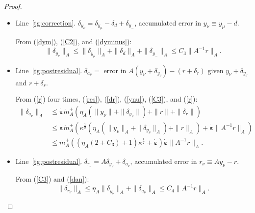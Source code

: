 \documentclass[onefignum,onetabnum]{siamart220329}
\newcommand{\ewed}{\boldsymbol{\dot{\varepsilon}}}
\newcommand{\aladot}{{\dot{m}}_A^+}
\begin{document}
{\begin{proof}
\begin{itemize}
From (\ref{pm}), (\ref{e2E}) twice, (\ref{ynu}), (\ref{C2}), and (\ref{dym}):
\begin{align}
\label{dyminus}
\|\delta_{y_-}\| &\le \ewed \|(y_\mu + \delta_{y_\mu}) - (d + \delta_{d})\| \\
&\le \ewed (\|y_\mu - d\| + \|\delta_{y_\mu}\| + \|\delta_{d}\|) \nonumber \\
&\le \ewed \kappa^\frac{1}{2} (\|y_\nu\|_A + \|\delta_{d}\|_A) + \ewed \|\delta_{y_\mu}\| \nonumber \\
&\le ((2 + C_2)\kappa^\frac{1}{2}  + (\eta_M + \alpha_M  (1 + \ewed))\ewed) \ewed  \|A^{-1}r\|_A \nonumber . 
\end{align}

\item Line~\ref{tg:correction}. $\delta_{y_\nu} = \delta_{y_\mu} - \delta_{d} + \delta_{y_-}$, accumulated error in  $y_\nu \equiv y_\mu - d$.

From (\ref{dym}), (\ref{C2}), and (\ref{dyminus}):
\begin{equation}
\|\delta_{y_\nu}\|_A \le \|\delta_{y_\mu}\|_A + \|\delta_{d}\|_A + \|\delta_{y_-}\|_A \le C_3 \|A^{-1}r\|_A .
\label{C3}
\end{equation}

\item Line~\ref{tg:postresidual}. $\delta_{a_\nu} =$ error in  $A(y_\nu + \delta_{y_\nu}) - (r + \delta_r)$ given $y_\nu + \delta_{y_\nu}$ and $r + \delta_r$.

From (\ref{r}) four times, (\ref{res}), (\ref{dr}), (\ref{ynu}), (\ref{C3}), and (\ref{r}):
\begin{align}
\label{dan}
\|\delta_{a_\nu}\|_A  
&\le \ewed \aladot (\eta_A (\|y_\nu\| + \|\delta_{y_\nu}\|) + \|r\| + \|\delta_r\|) \\
&\le \ewed \aladot (\kappa^\frac{1}{2} (\eta_A (\|y_\nu\|_A + \|\delta_{y_\nu}\|_A) + \|r\|_A) + \ewed \|A^{-1}r\|_A) \nonumber \\
&\le \aladot ((\eta_A (2 + C_3) + 1) \kappa^\frac{1}{2} + \ewed) \ewed \|A^{-1}r\|_A \nonumber .
\end{align}

\item Line~\ref{tg:postresidual}. $\delta_{r_\nu} = A\delta_{y_\nu} + \delta_{a_\nu}$, accumulated error in  $r_\nu \equiv Ay_\nu  - r$.

From (\ref{C3}) and (\ref{dan}):
\begin{equation}
\|\delta_{r_\nu}\|_A \le \eta_A \|\delta_{y_\nu}\|_A + \|\delta_{a_\nu}\|_A \le C_4 \|A^{-1}r\|_A  .
\label{C4}
\end{equation}


\end{itemize}
\end{proof}}
\end{document}
